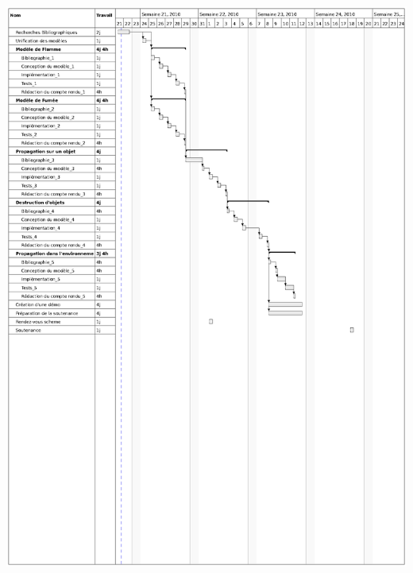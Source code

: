 \documentclass[a4paper,10pt]{article}
\begin{document}
	\includegraphics[scale=0.8]{../Planning/GANTT.ps}
	
\end{document}
